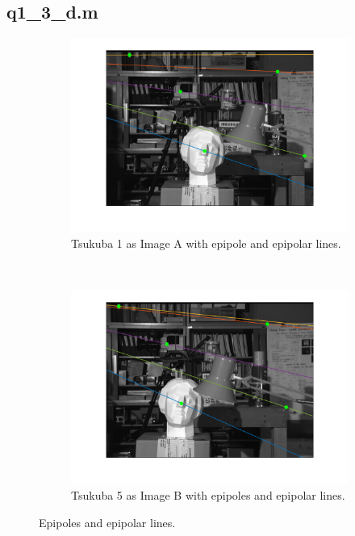 \documentclass[a4paper, 10pt, conference]{ieeeconf}
\begin{document}
\subsection*{q1\_3\_d.m}

\begin{figure}[!ht]
  \captionsetup[subfigure]{position=b}
  \centering
    \begin{subfigure}{0.45\linewidth}
      \includegraphics[width=\textwidth]{pic/q1_3_d_A}
      \caption{Tsukuba 1 as Image A  with epipole and epipolar lines.}
    \end{subfigure}
    ~
    \begin{subfigure}{0.45\linewidth}
      \includegraphics[width=\textwidth]{pic/q1_3_d_B}
      \caption{Tsukuba 5 as Image B with epipoles and epipolar lines.}
    \end{subfigure}

	\caption{Epipoles and epipolar lines.}
\end{figure}
\end{document}
